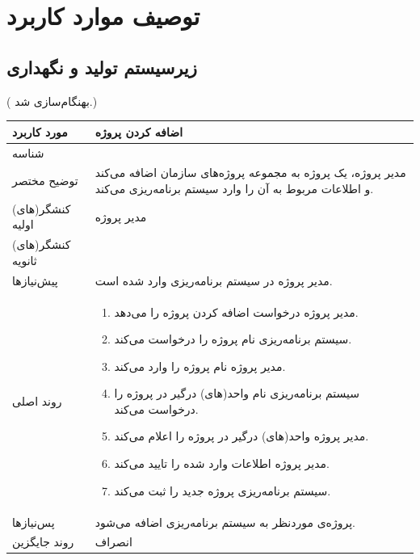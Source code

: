 \newpage
\section{توصیف موارد کاربرد}
\subsection{زیرسیستم تولید و نگهداری}


({\color{red} بهنگام‌سازی شد.})
\begin{table}[H]
	\centering
	\begin{tabular}{|p{3cm}|p{10cm}|}
		\hline
		
		
		مورد کاربرد	& اضافه کردن پروژه  \\
		\hline
		
		شناسه & 
		\stepcounter{usecase_ID}
		
		\arabic{usecase_ID} \\
		
		\hline
		
		توضیح مختصر & مدیر پروژه، یک پروژه به مجموعه پروژه‌های سازمان اضافه می‌کند و اطلاعات مربوط به آن را وارد سیستم برنامه‌ریزی می‌کند. \\
		\hline
		
		کنشگر(های) اولیه & مدیر پروژه \\
		\hline
		
		کنشگر(های) ثانویه&  \\
		\hline
		
		پیش‌نیازها &
		مدیر پروژه در سیستم برنامه‌ریزی وارد شده است.\\
		\hline
		
		
		روند اصلی &
		\begin{enumerate}[topsep=0cm,leftmargin=0.5cm]
			\item مدیر پروژه درخواست اضافه کردن پروژه را می‌دهد.
			\item سیستم برنامه‌ریزی نام پروژه را درخواست می‌کند.
			\item مدیر پروژه نام پروژه را وارد می‌کند. 
			\item سیستم برنامه‌ریزی نام واحد(های) درگیر در پروژه را درخواست می‌کند. 
			\item مدیر پروژه واحد(های) درگیر در پروژه را اعلام می‌کند. 
			\item  مدیر پروژه اطلاعات وارد شده را تایید می‌کند. 
			\item سیستم برنامه‌ریزی پروژه جدید را ثبت می‌کند.
		\end{enumerate} \\
		
		\hline
		
		پس‌نیازها &
		پروژه‌ی موردنظر به سیستم برنامه‌ریزی اضافه می‌شود. \\
		\hline
		
		روند جایگزین & انصراف \\
		\hline
		
	\end{tabular}
\end{table}


